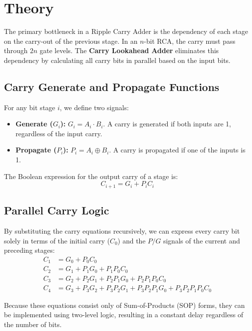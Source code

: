 \documentclass[11pt, a4paper]{article}
\begin{document}
\section{Theory}
The primary bottleneck in a Ripple Carry Adder is the dependency of each stage on the carry-out of the previous stage. In an $n$-bit RCA, the carry must pass through $2n$ gate levels. The \textbf{Carry Lookahead Adder} eliminates this dependency by calculating all carry bits in parallel based on the input bits.

\subsection{Carry Generate and Propagate Functions}
For any bit stage $i$, we define two signals:
\begin{itemize}
    \item \textbf{Generate ($G_i$):} $G_i = A_i \cdot B_i$. A carry is generated if both inputs are 1, regardless of the input carry.
    \item \textbf{Propagate ($P_i$):} $P_i = A_i \oplus B_i$. A carry is propagated if one of the inputs is 1.
\end{itemize}

The Boolean expression for the output carry of a stage is:
\[ C_{i+1} = G_i + P_i C_i \]

\subsection{Parallel Carry Logic}
By substituting the carry equations recursively, we can express every carry bit solely in terms of the initial carry ($C_0$) and the $P/G$ signals of the current and preceding stages:
\begin{align*}
    C_1 &= G_0 + P_0 C_0 \\
    C_2 &= G_1 + P_1 G_0 + P_1 P_0 C_0 \\
    C_3 &= G_2 + P_2 G_1 + P_2 P_1 G_0 + P_2 P_1 P_0 C_0 \\
    C_4 &= G_3 + P_3 G_2 + P_3 P_2 G_1 + P_3 P_2 P_1 G_0 + P_3 P_2 P_1 P_0 C_0
\end{align*}

Because these equations consist only of Sum-of-Products (SOP) forms, they can be implemented using two-level logic, resulting in a constant delay regardless of the number of bits.
\end{document}
